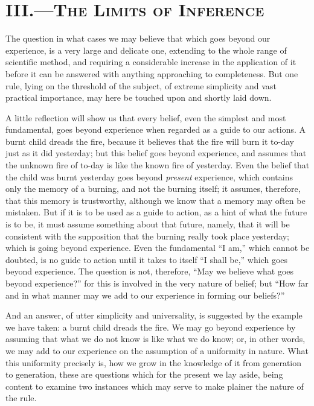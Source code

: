\documentclass[12pt]{article}
\begin{document}
\section*{III.---\textsc{The Limits of Inference}}

The question in what cases we may believe that which goes beyond our experience, is a very large and delicate one, extending to the whole range of scientific method, and requiring a considerable increase in the application of it before it can be answered with anything approaching to completeness.  But one rule, lying on the threshold of the subject, of extreme simplicity and vast practical importance, may here be touched upon and shortly laid down.

A little reflection will show us that every belief, even the simplest and most fundamental, goes beyond experience when regarded as a guide to our actions. A burnt child dreads the fire, because it believes that the fire will burn it to-day just as it did yesterday; but this belief goes beyond experience, and assumes that the unknown fire of to-day is like the known fire of yesterday. Even the belief that the child was burnt yesterday goes beyond \emph{present} experience, which contains only the memory of a burning, and not the burning itself; it assumes, therefore, that this memory is trustworthy, although we know that a memory may often be mistaken. But if it is to be used as a guide to action, as a hint of what the future is to be, it must assume something about that future, namely, that it will be consistent with the supposition that the burning really took place yesterday; which is going beyond experience. Even the fundamental ``I am,'' which cannot be doubted, is no guide to action until it takes to itself ``I shall be,'' which goes beyond experience. The question is not, therefore, ``May we believe what goes beyond experience?'' for this is involved in the very nature of belief; but ``How far and in what manner may we add to our experience in forming our beliefs?''

And an answer, of utter simplicity and universality, is suggested by the example we have taken: a burnt child dreads the fire. We may go beyond experience by assuming that what we do not know is like what we do know; or, in other words, we may add to our experience on the assumption of a uniformity in nature. What this uniformity precisely is, how we grow in the knowledge of it from generation to generation, these are questions which for the present we lay aside, being content to examine two instances which may serve to make plainer the nature of the rule.
\end{document}

